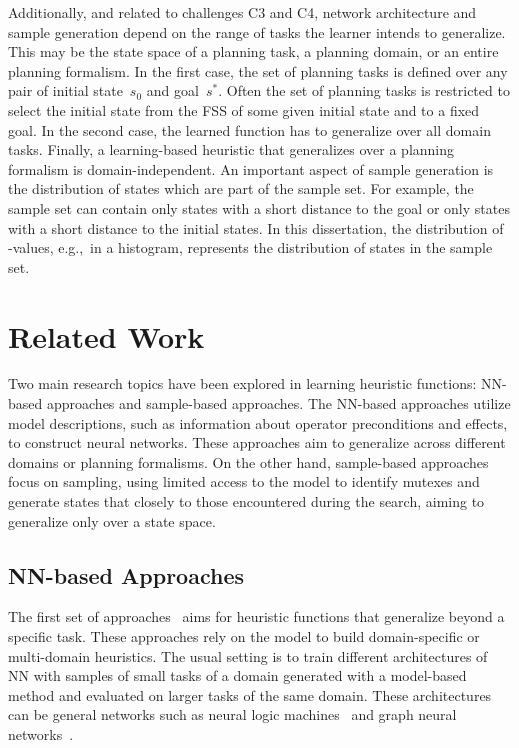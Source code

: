 Additionally, and related to challenges C3 and C4, network architecture and sample generation depend on the range of tasks the learner intends to generalize. This may be the state space of a planning task, a planning domain, or an entire planning formalism. In the first case, the set of planning tasks is defined over any pair of initial state~$s_0$ and goal~$s^*$. Often the set of planning tasks is restricted to select the initial state from the FSS of some given initial state and to a fixed goal. In the second case, the learned function has to generalize over all domain tasks. Finally, a learning-based heuristic that generalizes over a planning formalism is domain-independent. An important aspect of sample generation is the distribution of states which are part of the sample set. For example, the sample set can contain only states with a short distance to the goal or only states with a short distance to the initial states. In this dissertation, the distribution of \hstar-values, e.g.,~in a histogram, represents the distribution of states in the sample set.

\section{Related Work}
\label{sec:related-work}

Two main research topics have been explored in learning heuristic functions: NN-based approaches and sample-based approaches. The NN-based approaches utilize model descriptions, such as information about operator preconditions and effects, to construct neural networks. These approaches aim to generalize across different domains or planning formalisms. On the other hand, sample-based approaches focus on sampling, using limited access to the model to identify mutexes and generate states that closely to those encountered during the search, aiming to generalize only over a state space.

\subsection{NN-based Approaches}
\label{sec:related-work-nn-based}

The first set of approaches~\cite{toyer2018action,toyer2020asnets,shen2020learning,stahlberg2022learning,gehring2022reinforcement} aims for heuristic functions that generalize beyond a specific task. These approaches rely on the model to build domain-specific or multi-domain heuristics. The usual setting is to train different architectures of NN with samples of small tasks of a domain generated with a model-based method and evaluated on larger tasks of the same domain. These architectures can be general networks such as neural logic machines~\cite{dong2018neural} and graph neural networks~\cite{scarselli2008graph,gori2005new}.

